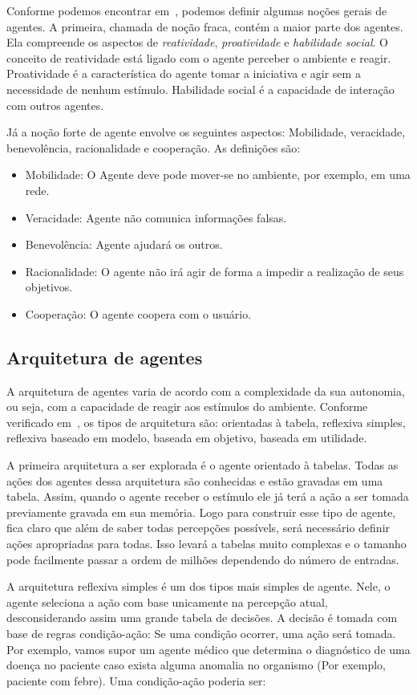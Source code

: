 Conforme podemos encontrar em~\cite{wooldridge04}, podemos definir algumas noções gerais de agentes. A primeira, chamada de noção fraca, contém a maior parte dos agentes. Ela compreende os aspectos de \emph{reatividade}, \emph{proatividade} e \emph{habilidade social}. O conceito de reatividade  está ligado com o agente perceber o ambiente e reagir. Proatividade é a característica do agente tomar a iniciativa e agir sem a necessidade de nenhum estímulo. Habilidade social é a capacidade de interação com outros agentes.

Já a noção forte de agente envolve os seguintes aspectos: Mobilidade, veracidade, benevolência, racionalidade e cooperação. As definições são:
\begin{itemize}
	\item Mobilidade: O Agente deve pode mover-se no ambiente, por exemplo, em uma rede.
	\item Veracidade: Agente não comunica informações falsas.
	\item Benevolência: Agente ajudará os outros.
	\item Racionalidade: O agente não irá agir de forma a impedir a realização de seus objetivos.
	\item Cooperação: O agente coopera com o usuário.
\end{itemize}

\subsection{Arquitetura de agentes}

A arquitetura de agentes varia de acordo com a complexidade da sua autonomia, ou seja, com a capacidade de reagir aos estímulos do ambiente. Conforme verificado em~\cite{novig95}, os tipos de arquitetura são: orientadas à tabela, reflexiva simples, reflexiva baseado em modelo, baseada em objetivo, baseada em utilidade.

A primeira arquitetura a ser explorada é o agente orientado à tabelas. Todas as ações dos agentes dessa arquitetura são conhecidas e estão gravadas em uma tabela. Assim, quando o agente receber o estímulo ele já terá a ação a ser tomada previamente gravada em sua memória. Logo para construir esse tipo de agente, fica claro que além de saber todas percepções possívels, será necessário definir ações apropriadas para todas. Isso levará a tabelas muito complexas e o tamanho pode facilmente passar a ordem de milhões dependendo do número de entradas.

A arquitetura reflexiva simples é um dos tipos mais simples de agente. Nele, o agente seleciona a ação com base unicamente na percepção atual, desconsiderando assim uma grande tabela de decisões. A decisão é tomada com base de regras condição-ação: Se uma condição ocorrer, uma ação será tomada. Por exemplo, vamos supor um agente médico que determina o diagnóstico de uma doença no paciente caso exista alguma anomalia no organismo (Por exemplo, paciente com febre). Uma condição-ação poderia ser:

